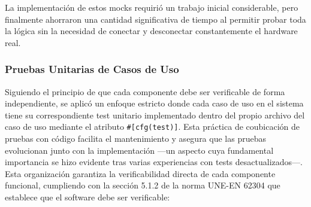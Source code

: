 La implementación de estos mocks requirió un trabajo inicial considerable, pero finalmente ahorraron una cantidad significativa de tiempo al permitir probar toda la lógica sin la necesidad de conectar y desconectar constantemente el hardware real.

\newpage
\subsubsection{Pruebas Unitarias de Casos de Uso}

Siguiendo el principio de que cada componente debe ser verificable de forma independiente, se aplicó un enfoque estricto donde cada caso de uso en el sistema tiene su correspondiente test unitario implementado dentro del propio archivo del caso de uso mediante el atributo \texttt{\#[cfg(test)]}. Esta práctica de coubicación de pruebas con código facilita el mantenimiento y asegura que las pruebas evolucionan junto con la implementación —un aspecto cuya fundamental importancia se hizo evidente tras varias experiencias con tests desactualizados—. Esta organización garantiza la verificabilidad directa de cada componente funcional, cumpliendo con la sección 5.1.2 de la norma UNE-EN 62304 que establece que el software debe ser verificable:

\begin{table}[ht]
    \centering
    \small
    \caption{Correspondencia entre casos de uso y tests unitarios}
    \label{tab:use_case_tests}
\end{table}

